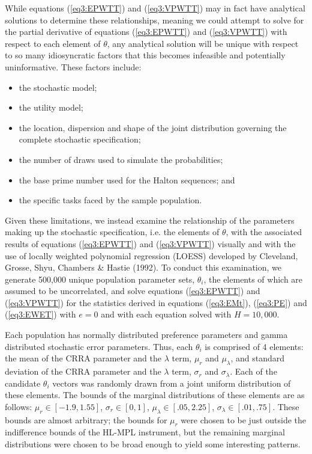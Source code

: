 \documentclass[../main.tex]{subfiles}
\begin{document}
While equations (\ref{eq3:EPWTT}) and (\ref{eq3:VPWTT}) may in fact have analytical solutions to determine these relationships, meaning we could attempt to solve for the partial derivative of equations (\ref{eq3:EPWTT}) and (\ref{eq3:VPWTT}) with respect to each element of $\theta$, any analytical solution will be unique with respect to so many idiosyncratic factors that this becomes infeasible and potentially uninformative.
These factors include:
\begin{itemize}
 \setlength\itemsep{-.25em}
	\item the stochastic model;
	\item the utility model;
	\item the location, dispersion and shape of the joint distribution governing the complete stochastic specification;
	\item the number of draws used to simulate the probabilities;
	\item the base prime number used for the Halton sequences; and
	\item the specific tasks faced by the sample population.
\end{itemize}

\noindent Given these limitations, we instead examine the relationship of the parameters making up the stochastic specification, i.e. the elements of $\theta$, with the associated results of equations (\ref{eq3:EPWTT}) and (\ref{eq3:VPWTT}) visually and with the use of locally weighted polynomial regression (LOESS) developed by Cleveland, Grosse, Shyu, Chambers \& Hastie (1992).
To conduct this examination, we generate 500,000 unique population parameter sets, $\theta_i$, the elements of which are assumed to be uncorrelated, and solve equations (\ref{eq3:EPWTT}) and (\ref{eq3:VPWTT}) for the statistics derived in equations (\ref{eq3:EMt}), (\ref{eq3:PE}) and (\ref{eq3:EWET}) with $e=0$ and with each equation solved with $H=10,000$.

Each population has normally distributed preference parameters and gamma distributed stochastic error parameters.
Thus, each $\theta_i$ is comprised of 4 elements: the mean of the CRRA parameter and the $\lambda$ term, $\mu_r$ and $\mu_\lambda$, and standard deviation of the CRRA parameter and the $\lambda$ term, $\sigma_r$ and $\sigma_\lambda$. Each of the candidate $\theta_i$ vectors was randomly drawn from a joint uniform distribution of these elements.
The bounds of the marginal distributions of these elements are as follows: $\mu_r \in [-1.9 , 1.55 ]$, $\sigma_r \in [0 , 1]$, $\mu_\lambda \in [.05 , 2.25]$, $\sigma_\lambda \in [.01 , .75]$.
These bounds are almost arbitrary; the bounds for $\mu_r$ were chosen to be just outside the indifference bounds of the HL-MPL instrument, but the remaining marginal distributions were chosen to be broad enough to yield some interesting patterns.
\end{document}
